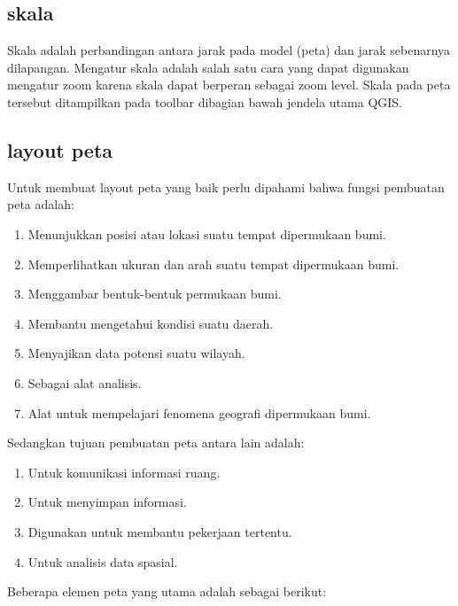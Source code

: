 	\subsection{skala}
	Skala adalah perbandingan antara jarak pada model (peta) dan jarak sebenarnya dilapangan. Mengatur skala adalah salah satu cara yang dapat digunakan mengatur zoom karena skala dapat berperan sebagai zoom level. Skala pada peta tersebut ditampilkan pada toolbar dibagian bawah jendela utama QGIS.
	\subsection{layout peta}
	Untuk membuat layout peta yang baik perlu dipahami bahwa fungsi pembuatan peta adalah:
	\begin{enumerate}
		\item Menunjukkan posisi atau lokasi suatu tempat dipermukaan bumi.
		\item Memperlihatkan ukuran dan arah suatu tempat dipermukaan bumi.
		\item Menggambar bentuk-bentuk permukaan bumi.
		\item Membantu mengetahui kondisi suatu daerah.
		\item Menyajikan data potensi suatu wilayah.
		\item Sebagai alat analisis.
		\item Alat untuk mempelajari fenomena geografi dipermukaan bumi.
	\end{enumerate}
	Sedangkan tujuan pembuatan peta antara lain adalah:
	\begin{enumerate}
		\item Untuk komunikasi informasi ruang.
		\item Untuk menyimpan informasi.
		\item Digunakan untuk membantu pekerjaan tertentu.
		\item Untuk analisis data spasial.
	\end{enumerate}
	Beberapa elemen peta yang utama adalah sebagai berikut:
